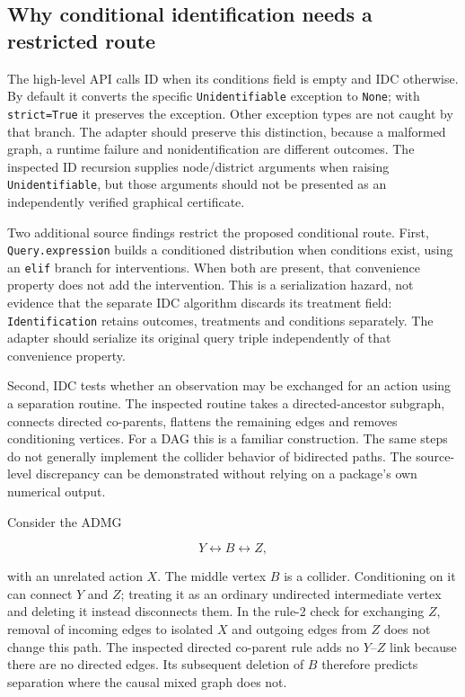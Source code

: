 \hypertarget{why-conditional-identification-needs-a-restricted-route}{%
\subsection{Why conditional identification needs a restricted
route}\label{why-conditional-identification-needs-a-restricted-route}}

The high-level API calls ID when its conditions field is empty and IDC
otherwise. By default it converts the specific \texttt{Unidentifiable}
exception to \texttt{None}; with \texttt{strict=True} it preserves the
exception. Other exception types are not caught by that branch. The
adapter should preserve this distinction, because a malformed graph, a
runtime failure and nonidentification are different outcomes. The
inspected ID recursion supplies node/district arguments when raising
\texttt{Unidentifiable}, but those arguments should not be presented as
an independently verified graphical certificate.
\citep{exec13_y0_api,exec13_y0_id}

Two additional source findings restrict the proposed conditional route.
First, \texttt{Query.expression} builds a conditioned distribution when
conditions exist, using an \texttt{elif} branch for interventions. When
both are present, that convenience property does not add the
intervention. This is a serialization hazard, not evidence that the
separate IDC algorithm discards its treatment field:
\texttt{Identification} retains outcomes, treatments and conditions
separately. The adapter should serialize its original query triple
independently of that convenience property. \citep{exec13_y0_utils}

Second, IDC tests whether an observation may be exchanged for an action
using a separation routine. The inspected routine takes a
directed-ancestor subgraph, connects directed co-parents, flattens the
remaining edges and removes conditioning vertices. For a DAG this is a
familiar construction. The same steps do not generally implement the
collider behavior of bidirected paths. The source-level discrepancy can
be demonstrated without relying on a package's own numerical output.
\citep{exec13_y0_idc,exec13_y0_rule2,exec13_y0_separation,exec13_y0_graph}

Consider the ADMG

\[
 Y\leftrightarrow B\leftrightarrow Z,
\]

with an unrelated action \(X\). The middle vertex \(B\) is a collider.
Conditioning on it can connect \(Y\) and \(Z\); treating it as an
ordinary undirected intermediate vertex and deleting it instead
disconnects them. In the rule-2 check for exchanging \(Z\), removal of
incoming edges to isolated \(X\) and outgoing edges from \(Z\) does not
change this path. The inspected directed co-parent rule adds no
\(Y\)--\(Z\) link because there are no directed edges. Its subsequent
deletion of \(B\) therefore predicts separation where the causal mixed
graph does not.

